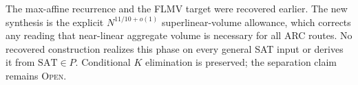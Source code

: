 The max-affine recurrence and the FLMV target were recovered earlier.  The
new synthesis is the explicit $N^{11/10+o(1)}$ superlinear-volume allowance,
which corrects any reading that near-linear aggregate volume is necessary for
all ARC routes.  No recovered construction realizes this phase on every
general SAT input or derives it from $\mathrm{SAT}\in P$.  Conditional
$K$ elimination is preserved; the separation claim remains \textsc{Open}.

